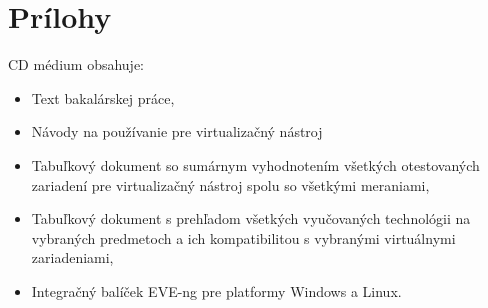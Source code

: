 \chapter*{Prílohy}

CD médium obsahuje:

\begin{itemize}[noitemsep]
    \item Text bakalárskej práce,
    \item Návody na používanie pre virtualizačný nástroj
    \item Tabuľkový dokument so sumárnym vyhodnotením všetkých otestovaných zariadení pre virtualizačný nástroj spolu so všetkými meraniami,
    \item Tabuľkový dokument s prehľadom všetkých vyučovaných technológii na vybraných predmetoch a ich kompatibilitou s vybranými virtuálnymi zariadeniami,
    \item Integračný balíček EVE-ng pre platformy Windows a Linux.
\end{itemize}